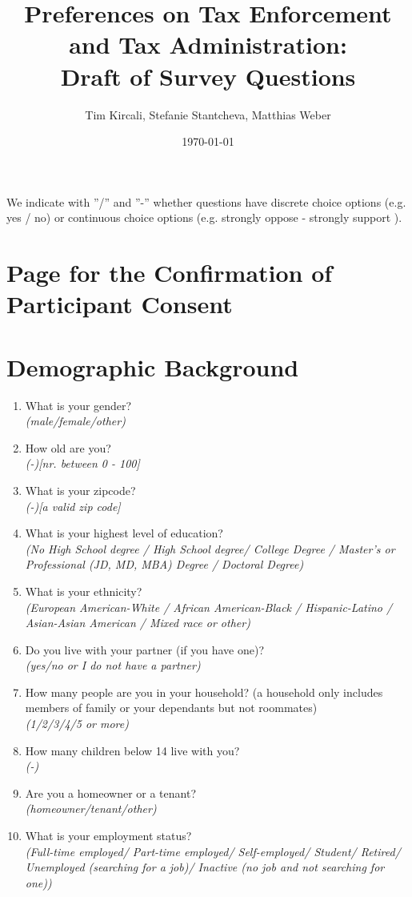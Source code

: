 \documentclass[11pt]{article}
\title{Preferences on Tax Enforcement and Tax Administration:\\Draft of Survey Questions}
\author{Tim Kircali, Stefanie Stantcheva, Matthias Weber}
\date{\today} %
\begin{document}
\maketitle

\noindent We indicate with ”/” and ”-” whether questions have discrete choice options (e.g. yes / no) or continuous choice options (e.g. strongly oppose - strongly support ). 
\section*{Page for the Confirmation of Participant Consent}
\section*{Demographic Background}
\begin{enumerate}
    \item What is your gender? \\ \textit{(male/female/other)} 
    \item How old are you? \\ \textit{(-)[nr. between 0 - 100]}
    \item What is your zipcode? \\ \textit{(-)[a valid zip code]}
    \item What is your highest level of education? \\ \textit{(No High School degree / High School degree/ College Degree / Master’s or Professional (JD, MD, MBA) Degree / Doctoral Degree)}
    \item What is your ethnicity? \\ \textit{(European American-White / African American-Black / Hispanic-Latino / Asian-Asian American / Mixed race or other)}
    \item Do you live with your partner (if you have one)? \\ \textit{(yes/no or I do not have a partner)}
    \item How many people are you in your household? (a household only includes members of family or your dependants but not roommates) \\ \textit{(1/2/3/4/5 or more)}
    \item How many children below 14 live with you? \\ \textit{(-)}
    \item Are you a homeowner or a tenant? \\ \textit{(homeowner/tenant/other)}
    \item What is your employment status? \\ \textit{(Full-time employed/ Part-time employed/ Self-employed/ Student/ Retired/ Unemployed (searching for a job)/ Inactive (no job and not searching for one))}

\end{enumerate}
\end{document}
